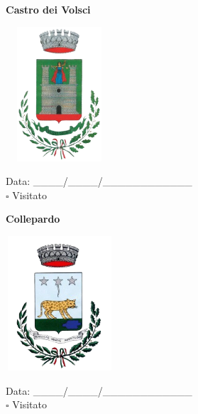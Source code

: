 \documentclass[a5paper,12pt]{article}
\begin{document}
\newpage

\noindent
\begin{minipage}[t]{0.45\textwidth}
    \begin{center}
        \textbf{Castro dei Volsci}
    \end{center}
    \vspace{-0.5cm} %
    \begin{center}
        \includegraphics[height= 5cm, width=4cm]{Lazio/Stemma Castro dei Volsci.png}
    \end{center}
    \vspace{-0.4cm} %
    \begin{flushleft}
        Data: \_\_\_\_/\_\_\_\_/\_\_\_\_\_\_\_\_\_\_\_\_ \\
        $\square$ Visitato
    \end{flushleft}
\end{minipage}
\hfill
\noindent
\begin{minipage}[t]{0.45\textwidth}
    \begin{center}
        \textbf{Collepardo}
    \end{center}
    \vspace{-0.5cm} %
    \begin{center}
        \includegraphics[height= 5cm, width=4cm]{Lazio/Stemma Collepardo.png}
    \end{center}
    \vspace{-0.4cm} %
    \begin{flushleft}
        Data: \_\_\_\_/\_\_\_\_/\_\_\_\_\_\_\_\_\_\_\_\_ \\
        $\square$ Visitato
    \end{flushleft}
\end{minipage}
\end{document}

